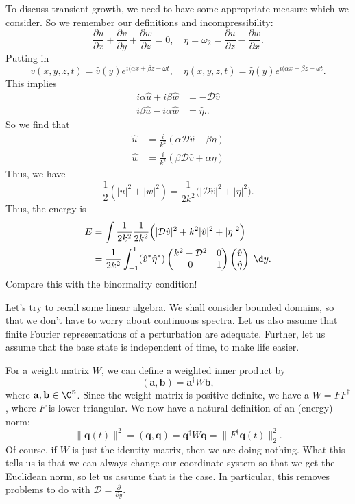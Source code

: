 \documentclass[a4paper]{article}
\begin{document}
To discuss transient growth, we need to have some appropriate measure which we consider. So we remember our definitions and incompressibility:
\[
  \frac{\partial u}{\partial x} + \frac{\partial v}{\partial y} + \frac{\partial w}{\partial z} = 0,\quad \eta = \omega_2 = \frac{\partial u}{\partial z} - \frac{\partial w}{\partial x}.
\]
Putting in
\[
  v(x, y, z, t) = \hat{v}(y) e^{i(\alpha x + \beta z - \omega t},\quad \eta(x, y, z, t) = \hat{\eta}(y) e^{i(\alpha x + \beta z - \omega t}.
\]
This implies
\begin{align*}
  i\alpha \hat{u} + i \beta \hat{w} &= - \mathcal{D} \hat{v}\\
  i\beta \hat{u} - i\alpha \hat{w} &= \hat{\eta}..
\end{align*}
So we find that
\begin{align*}
  \hat{u} &= \frac{i}{k^2}(\alpha \mathcal{D} \hat{v} - \beta \eta)\\
  \hat{w} &= \frac{i}{k^2}(\beta \mathcal{D} \hat{v} + \alpha \eta)
\end{align*}
Thus, we have
\[
  \frac{1}{2}(|u|^2 + |w|^2) = \frac{1}{2k^2} \Big(|\mathcal{D} \hat{v}|^2 + |\eta|^2\Big).
\]
Thus, the energy is
\begin{align*}
  E &= \int \frac{1}{2k^2} \frac{1}{2k^2} \Big(|\mathcal{D} \hat{v}|^2 + k^2 |\hat{v}|^2 + |\eta|^2\Big)\\
  &= \frac{1}{2k^2} \int_{-1}^1 (\hat{v}^* \hat{\eta}^*)
  \begin{pmatrix}
    k^2 - \mathcal{D}^2 & 0\\
    0 & 1
  \end{pmatrix}
  \begin{pmatrix}
    \hat{v}\\
    \hat{\eta}
  \end{pmatrix}\;\d y.
\end{align*}
Compare this with the binormality condition!

Let's try to recall some linear algebra. We shall consider bounded domains, so that we don't have to worry about continuous spectra. Let us also assume that finite Fourier representations of a perturbation are adequate. Further, let us assume that the base state is independent of time, to make life easier.

For a weight matrix $W$, we can define a weighted inner product by
\[
  (\mathbf{a}, \mathbf{b}) = \mathbf{a}^\dagger W\mathbf{b},
\]
where $\mathbf{a}, \mathbf{b} \in \C^n$. Since the weight matrix is positive definite, we have a  $W = FF^\dagger$, where $F$ is lower triangular. We now have a natural definition of an (energy) norm:
\[
  \|\mathbf{q}(t)\|^2 = (\mathbf{q}, \mathbf{q}) = \mathbf{q}^\dagger W\mathbf{q} = \|F^\dagger \mathbf{q}(t)\|_2^2.
\]
Of course, if $W$ is just the identity matrix, then we are doing nothing. What this tells us is that we can always change our coordinate system so that we get the Euclidean norm, so let us assume that is the case. In particular, this removes problems to do with $\mathcal{D} = \frac{\partial}{\partial y}$.
\end{document}
